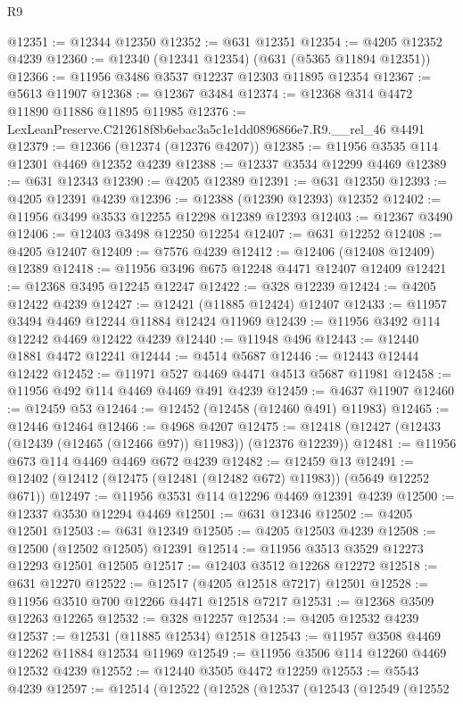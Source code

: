 \begin{lexlean}{R9}
\begin{coremodule}
@12351 := @12344 @12350
@12352 := @631 @12351
@12354 := @4205 @12352 @4239
@12360 := @12340 (@12341 @12354) (@631 (@5365 @11894 @12351))
@12366 := @11956 @3486 @3537 @12237 @12303 @11895 @12354
@12367 := @5613 @11907
@12368 := @12367 @3484
@12374 := @12368 @314 @4472 @11890 @11886 @11895 @11985
@12376 := LexLeanPreserve.C212618f8b6ebac3a5c1e1dd0896866e7.R9.__rel_46 @4491
@12379 := @12366 (@12374 (@12376 @4207))
@12385 := @11956 @3535 @114 @12301 @4469 @12352 @4239
@12388 := @12337 @3534 @12299 @4469
@12389 := @631 @12343
@12390 := @4205 @12389
@12391 := @631 @12350
@12393 := @4205 @12391 @4239
@12396 := @12388 (@12390 @12393) @12352
@12402 := @11956 @3499 @3533 @12255 @12298 @12389 @12393
@12403 := @12367 @3490
@12406 := @12403 @3498 @12250 @12254
@12407 := @631 @12252
@12408 := @4205 @12407
@12409 := @7576 @4239
@12412 := @12406 (@12408 @12409) @12389
@12418 := @11956 @3496 @675 @12248 @4471 @12407 @12409
@12421 := @12368 @3495 @12245 @12247
@12422 := @328 @12239
@12424 := @4205 @12422 @4239
@12427 := @12421 (@11885 @12424) @12407
@12433 := @11957 @3494 @4469 @12244 @11884 @12424 @11969
@12439 := @11956 @3492 @114 @12242 @4469 @12422 @4239
@12440 := @11948 @496
@12443 := @12440 @1881 @4472 @12241
@12444 := @4514 @5687
@12446 := @12443 @12444 @12422
@12452 := @11971 @527 @4469 @4471 @4513 @5687 @11981
@12458 := @11956 @492 @114 @4469 @4469 @491 @4239
@12459 := @4637 @11907
@12460 := @12459 @53
@12464 := @12452 (@12458 (@12460 @491) @11983)
@12465 := @12446 @12464
@12466 := @4968 @4207
@12475 := @12418 (@12427 (@12433 (@12439 (@12465 (@12466 @97)) @11983)) (@12376 @12239))
@12481 := @11956 @673 @114 @4469 @4469 @672 @4239
@12482 := @12459 @13
@12491 := @12402 (@12412 (@12475 (@12481 (@12482 @672) @11983)) (@5649 @12252 @671))
@12497 := @11956 @3531 @114 @12296 @4469 @12391 @4239
@12500 := @12337 @3530 @12294 @4469
@12501 := @631 @12346
@12502 := @4205 @12501
@12503 := @631 @12349
@12505 := @4205 @12503 @4239
@12508 := @12500 (@12502 @12505) @12391
@12514 := @11956 @3513 @3529 @12273 @12293 @12501 @12505
@12517 := @12403 @3512 @12268 @12272
@12518 := @631 @12270
@12522 := @12517 (@4205 @12518 @7217) @12501
@12528 := @11956 @3510 @700 @12266 @4471 @12518 @7217
@12531 := @12368 @3509 @12263 @12265
@12532 := @328 @12257
@12534 := @4205 @12532 @4239
@12537 := @12531 (@11885 @12534) @12518
@12543 := @11957 @3508 @4469 @12262 @11884 @12534 @11969
@12549 := @11956 @3506 @114 @12260 @4469 @12532 @4239
@12552 := @12440 @3505 @4472 @12259
@12553 := @5543 @4239
@12597 := @12514
    (@12522
      (@12528
        (@12537
          (@12543
            (@12549
              (@12552

\end{coremodule}
\end{lexlean}
